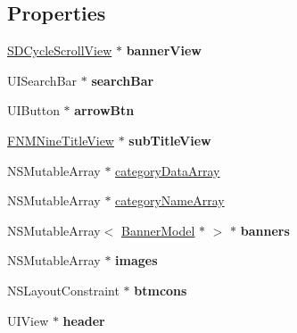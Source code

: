 \subsection*{Properties}
\begin{DoxyCompactItemize}
\item 
\mbox{\label{category_shop_rebates_view_controller_07_08_a8447378d92ce3aa577439a03fbda57fd}} 
\mbox{\hyperlink{interface_s_d_cycle_scroll_view}{S\+D\+Cycle\+Scroll\+View}} $\ast$ {\bfseries banner\+View}
\item 
\mbox{\label{category_shop_rebates_view_controller_07_08_aca83cf15e4638e6da95a0397ec0bb293}} 
U\+I\+Search\+Bar $\ast$ {\bfseries search\+Bar}
\item 
\mbox{\label{category_shop_rebates_view_controller_07_08_abe445aa38b5f619561c1b67796a274da}} 
U\+I\+Button $\ast$ {\bfseries arrow\+Btn}
\item 
\mbox{\label{category_shop_rebates_view_controller_07_08_a786e60bd7059a67c9e864c7f303f6821}} 
\mbox{\hyperlink{interface_f_n_m_nine_title_view}{F\+N\+M\+Nine\+Title\+View}} $\ast$ {\bfseries sub\+Title\+View}
\item 
N\+S\+Mutable\+Array $\ast$ \mbox{\hyperlink{category_shop_rebates_view_controller_07_08_a779b10662360da9a905273b7191c5ed3}{category\+Data\+Array}}
\item 
N\+S\+Mutable\+Array $\ast$ \mbox{\hyperlink{category_shop_rebates_view_controller_07_08_a8d4e55a9f37058c0adc4bc48e367f2b3}{category\+Name\+Array}}
\item 
\mbox{\label{category_shop_rebates_view_controller_07_08_a94e21aa56e3afe1cbc7f31abe1ea0bd7}} 
N\+S\+Mutable\+Array$<$ \mbox{\hyperlink{interface_banner_model}{Banner\+Model}} $\ast$ $>$ $\ast$ {\bfseries banners}
\item 
\mbox{\label{category_shop_rebates_view_controller_07_08_a587b856e1e41251121126872c350a819}} 
N\+S\+Mutable\+Array $\ast$ {\bfseries images}
\item 
\mbox{\label{category_shop_rebates_view_controller_07_08_a5952c49edf0650f78ef02c048857187d}} 
N\+S\+Layout\+Constraint $\ast$ {\bfseries btmcons}
\item 
\mbox{\label{category_shop_rebates_view_controller_07_08_afea61d0eac65d6b2826d5700e5341619}} 
U\+I\+View $\ast$ {\bfseries header}
\end{DoxyCompactItemize}


